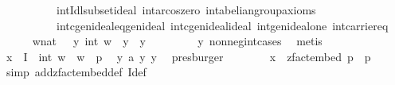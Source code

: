 \begin{isabellebody}
\ \ \ \ \ \ \ \ \ \ int{\isachardot}{\kern0pt}Idl{\isacharunderscore}{\kern0pt}subset{\isacharunderscore}{\kern0pt}ideal{\isacharprime}{\kern0pt}\ int{\isachardot}{\kern0pt}a{\isacharunderscore}{\kern0pt}rcos{\isacharunderscore}{\kern0pt}zero\ int{\isachardot}{\kern0pt}abelian{\isacharunderscore}{\kern0pt}group{\isacharunderscore}{\kern0pt}axioms\isanewline
\ \ \ \ \ \ \ \ \ \ int{\isachardot}{\kern0pt}cgenideal{\isacharunderscore}{\kern0pt}eq{\isacharunderscore}{\kern0pt}genideal\ int{\isachardot}{\kern0pt}cgenideal{\isacharunderscore}{\kern0pt}ideal\ int{\isachardot}{\kern0pt}genideal{\isacharunderscore}{\kern0pt}one\ int{\isacharunderscore}{\kern0pt}carrier{\isacharunderscore}{\kern0pt}eq{\isacharparenright}{\kern0pt}\isanewline
\ \ \ \ \isamarkupfalse%
\ w{\isacharcolon}{\kern0pt}{\isacharcolon}{\kern0pt}nat\ \ \ y{\isacharunderscore}{\kern0pt}{}{\isacharcolon}{\kern0pt}\ {\isachardoublequoteopen}int\ w\ {\isacharequal}{\kern0pt}\ y\ {\isasymoplus}\isactrlbsub {\isasymZ}\isactrlesub \ y{\isacharprime}{\kern0pt}{\isachardoublequoteclose}\ \isanewline
\ \ \ \ \ \ \isamarkupfalse%
\ y{\isacharunderscore}{\kern0pt}{}\ nonneg{\isacharunderscore}{\kern0pt}int{\isacharunderscore}{\kern0pt}cases\ \isamarkupfalse%
\ metis\isanewline
\ \ \ \ \isamarkupfalse%
\ {\isachardoublequoteopen}x\ {\isacharequal}{\kern0pt}\ I\ {\isacharplus}{\kern0pt}{\isachargreater}{\kern0pt}\isactrlbsub {\isasymZ}\isactrlesub \ {\isacharparenleft}{\kern0pt}int\ w{\isacharparenright}{\kern0pt}{\isachardoublequoteclose}\ \ {\isachardoublequoteopen}w\ {\isacharless}{\kern0pt}\ p{\isachardoublequoteclose}\ \isamarkupfalse%
\ y{\isacharunderscore}{\kern0pt}{}\ a{}\ y{\isacharunderscore}{\kern0pt}{}\ y{\isacharunderscore}{\kern0pt}{}\ \isamarkupfalse%
\ presburger{\isacharplus}{\kern0pt}\ \ \isanewline
\ \ \ \ \isamarkupfalse%
\ {\isachardoublequoteopen}x\ {\isasymin}\ zfact{\isacharunderscore}{\kern0pt}embed\ p\ {\isacharbackquote}{\kern0pt}\ {\isacharbraceleft}{\kern0pt}{}{\isachardot}{\kern0pt}{\isachardot}{\kern0pt}{\isacharless}{\kern0pt}p{\isacharbraceright}{\kern0pt}{\isachardoublequoteclose}\ \isamarkupfalse%
\ {\isacharparenleft}{\kern0pt}simp\ add{\isacharcolon}{\kern0pt}zfact{\isacharunderscore}{\kern0pt}embed{\isacharunderscore}{\kern0pt}def\ I{\isacharunderscore}{\kern0pt}def{\isacharparenright}{\kern0pt}\isanewline
\ \ \isamarkupfalse%

\end{isabellebody}

